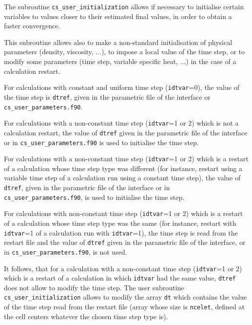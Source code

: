 {{{The subroutine \texttt{cs\_user\_initialization} allows if necessary to initialise certain
variables to values closer to their estimated final values, in order to
obtain a faster convergence.

This subroutine allows also to make a non-standard initialisation of
physical parameters (density, viscosity, ...), to impose a local
value of the time step, or to modify some parameters (time step,
variable specific heat, ...) in the case of a calculation restart.

\begin{list}{-}{}
\item For calculations with constant and uniform time step
      (\texttt{idtvar}=0), the value of the time step is \texttt{dtref},
      given in the parametric file of the interface or \texttt{cs\_user\_parameters.f90}.
\item For calculations with a non-constant time step
      (\texttt{idtvar}=1 or 2) which is not a calculation restart,
      the value of \texttt{dtref} given in the parametric file of the interface
      or in \texttt{cs\_user\_parameters.f90} is used to initialise the time step.
\item For calculations with a non-constant time step
      (\texttt{idtvar}=1 or 2) which is a restart of a
      calculation whose time step type was different (for instance, restart
      using a variable time step of a calculation run using a constant time
      step), the value of \texttt{dtref}, given in the parametric file of the
      interface or in \texttt{cs\_user\_parameters.f90}, is used to initialise the time step.
\item For calculations with non-constant time step
      (\texttt{idtvar}=1 or 2) which is a restart of a
      calculation whose time step type was the same (for instance, restart with
      \texttt{idtvar}=1 of a calculation run with \texttt{idtvar}=1), the time
      step is read from the restart file and the value of \texttt{dtref} given
      in the parametric file of the interface, or in \texttt{cs\_user\_parameters.f90}, is not used.
\end{list}
It follows, that for a calculation with a non-constant time step (\texttt{idtvar}=1
or 2) which is a restart of a calculation in which
\texttt{idtvar} had the same value, \texttt{dtref} does not allow to modify the
time step. The user subroutine \texttt{cs\_user\_initialization} allows to modify the array
\texttt{dt} which contains the value of the time step read from the restart file
(array whose size is \texttt{ncelet}, defined at the cell centers whatever the
chosen time step type is).

}}}

